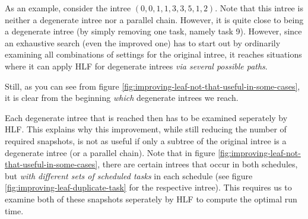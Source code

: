 As an example, consider the intree $(0,0,1,1,3,3,5,1,2)$. Note that this intree is neither a degenerate intree nor a parallel chain. However, it is quite close to being a degenerate intree (by simply removing one task, namely task 9). However, since an exhaustive search (even the improved one) has to start out by ordinarily examining all combinations of settings for the original intree, it reaches situations where it can apply HLF for degenerate intrees \emph{via several possible paths}.

Still, as you can see from figure \ref{fig:improving-leaf-not-that-useful-in-some-cases}, it is clear from the beginning \emph{which} degenerate intrees we reach. 

Each degenerate intree that is reached then has to be examined seperately by HLF. This explains why this improvement, while still reducing the number of required snapshots, is not as useful if only a subtree of the original intree is a degenerate intree (or a parallel chain). Note that in figure \ref{fig:improving-leaf-not-that-useful-in-some-cases}, there are certain intrees  that occur in both schedules, but \emph{with different sets of scheduled tasks} in each schedule (see figure \ref{fig:improving-leaf-duplicate-task} for the respective intree). This requires us to examine both of these snapshots seperately by HLF to compute the optimal run time.

